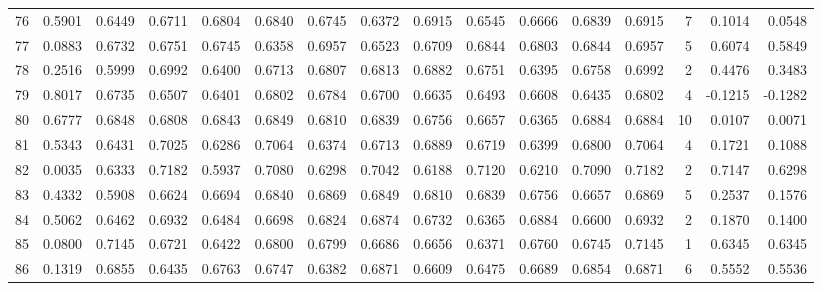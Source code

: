 \begin{tabular}{lrrrrrrrrrrrrrrr}
76  &      0.5901 &  0.6449 &  0.6711 &  0.6804 &  0.6840 &  0.6745 &  0.6372 &  0.6915 &  0.6545 &  0.6666 &   0.6839 &     0.6915 &      7 &                    0.1014 &                     0.0548 \\
77  &      0.0883 &  0.6732 &  0.6751 &  0.6745 &  0.6358 &  0.6957 &  0.6523 &  0.6709 &  0.6844 &  0.6803 &   0.6844 &     0.6957 &      5 &                    0.6074 &                     0.5849 \\
78  &      0.2516 &  0.5999 &  0.6992 &  0.6400 &  0.6713 &  0.6807 &  0.6813 &  0.6882 &  0.6751 &  0.6395 &   0.6758 &     0.6992 &      2 &                    0.4476 &                     0.3483 \\
79  &      0.8017 &  0.6735 &  0.6507 &  0.6401 &  0.6802 &  0.6784 &  0.6700 &  0.6635 &  0.6493 &  0.6608 &   0.6435 &     0.6802 &      4 &                   -0.1215 &                    -0.1282 \\
80  &      0.6777 &  0.6848 &  0.6808 &  0.6843 &  0.6849 &  0.6810 &  0.6839 &  0.6756 &  0.6657 &  0.6365 &   0.6884 &     0.6884 &     10 &                    0.0107 &                     0.0071 \\
81  &      0.5343 &  0.6431 &  0.7025 &  0.6286 &  0.7064 &  0.6374 &  0.6713 &  0.6889 &  0.6719 &  0.6399 &   0.6800 &     0.7064 &      4 &                    0.1721 &                     0.1088 \\
82  &      0.0035 &  0.6333 &  0.7182 &  0.5937 &  0.7080 &  0.6298 &  0.7042 &  0.6188 &  0.7120 &  0.6210 &   0.7090 &     0.7182 &      2 &                    0.7147 &                     0.6298 \\
83  &      0.4332 &  0.5908 &  0.6624 &  0.6694 &  0.6840 &  0.6869 &  0.6849 &  0.6810 &  0.6839 &  0.6756 &   0.6657 &     0.6869 &      5 &                    0.2537 &                     0.1576 \\
84  &      0.5062 &  0.6462 &  0.6932 &  0.6484 &  0.6698 &  0.6824 &  0.6874 &  0.6732 &  0.6365 &  0.6884 &   0.6600 &     0.6932 &      2 &                    0.1870 &                     0.1400 \\
85  &      0.0800 &  0.7145 &  0.6721 &  0.6422 &  0.6800 &  0.6799 &  0.6686 &  0.6656 &  0.6371 &  0.6760 &   0.6745 &     0.7145 &      1 &                    0.6345 &                     0.6345 \\
86  &      0.1319 &  0.6855 &  0.6435 &  0.6763 &  0.6747 &  0.6382 &  0.6871 &  0.6609 &  0.6475 &  0.6689 &   0.6854 &     0.6871 &      6 &                    0.5552 &                     0.5536 \\

\end{tabular}
